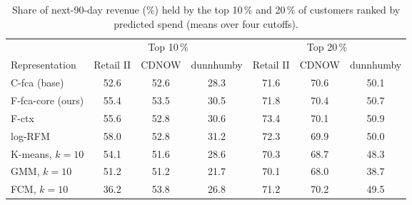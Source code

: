 \begin{table}[t]
\centering\footnotesize
\caption{Share of next-90-day revenue (\%) held by the top 10\,\% and 20\,\% of customers ranked by predicted spend (means over four cutoffs).}
\label{tab:targeting}
\begin{tabular}{lcccccc}
\toprule
 & \multicolumn{3}{c}{Top 10\,\%} & \multicolumn{3}{c}{Top 20\,\%} \\
\cmidrule(lr){2-4}\cmidrule(lr){5-7}
Representation & Retail II & CDNOW & dunnhumby & Retail II & CDNOW & dunnhumby \\
\midrule
C-fca (base) & 52.6 & 52.6 & 28.3 & 71.6 & 70.6 & 50.1 \\
F-fca-core (ours) & 55.4 & 53.5 & 30.5 & 71.8 & 70.4 & 50.7 \\
F-ctx & 55.6 & 52.8 & 30.6 & 73.4 & 70.1 & 50.9 \\
log-RFM & 58.0 & 52.8 & 31.2 & 72.3 & 69.9 & 50.0 \\
K-means, $k{=}10$ & 54.1 & 51.6 & 28.6 & 70.3 & 68.7 & 48.3 \\
GMM, $k{=}10$ & 51.2 & 51.2 & 21.7 & 70.1 & 68.0 & 38.7 \\
FCM, $k{=}10$ & 36.2 & 53.8 & 26.8 & 71.2 & 70.2 & 49.5 \\
\bottomrule
\end{tabular}
\end{table}
